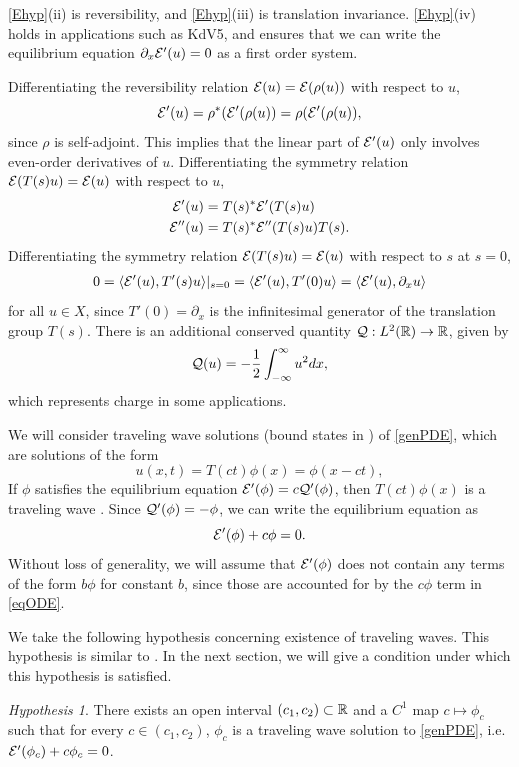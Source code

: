 \documentclass[11pt,reqno]{amsart}
\theoremstyle{plain}
\theoremstyle{definition}
\theoremstyle{remark}
\newtheorem{hypothesis}[theorem]{Hypothesis}
\begin{document}
\noi \cref{Ehyp}(ii) is reversibility, and \cref{Ehyp}(iii) is translation invariance. \cref{Ehyp}(iv) holds in applications such as KdV5, and ensures that we can write the equilibrium equation $\partial_x \mathcal{E}'(u) = 0$ as a first order system.

Differentiating the reversibility relation $\mathcal{E}(u) = \mathcal{E}(\rho(u))$ with respect to $u$,
\[
\mathcal{E}'(u) = \rho^*( \mathcal{E}'(\rho(u) ) = \rho( \mathcal{E}'(\rho(u) ),
\]
since $\rho$ is self-adjoint. This implies that the linear part of $\mathcal{E}'(u)$ only involves even-order derivatives of $u$. Differentiating the symmetry relation $\mathcal{E}(T(s)u) = \mathcal{E}(u)$ with respect to $u$,
\begin{align}
\mathcal{E}'(u) &= T(s)^* \mathcal{E}'(T(s)u) \label{Eprimesymm} \\
\mathcal{E}''(u) &= T(s)^* \mathcal{E}''(T(s)u) T(s). \label{EHessiansymm}
\end{align}
Differentiating the symmetry relation $\mathcal{E}(T(s)u) = \mathcal{E}(u)$ with respect to $s$ at $s = 0$, 
\begin{align*}
0 = \langle \mathcal{E}'(u), T'(s) u \rangle|_{s = 0}
= \langle \mathcal{E}'(u), T'(0) u \rangle
= \langle \mathcal{E}'(u), \partial_x u \rangle
\end{align*}
for all $u \in X$, since $T'(0) = \partial_x$ is the infinitesimal generator of the translation group $T(s)$. There is an additional conserved quantity $\mathcal{Q}: L^2(\mathbb{R}) \rightarrow \mathbb{R}$, given by
\begin{equation}\label{defV}
\mathcal{Q}(u) = -\frac{1}{2} \int_{-\infty}^\infty u^2 dx,
\end{equation}
which represents charge in some applications. 

We will consider traveling wave solutions (bound states in \cite{Grillakis1987}) of \cref{genPDE}, which are solutions of the form
\begin{equation}
u(x, t) = T(ct)\phi(x) = \phi(x - ct),
\end{equation}
If $\phi$ satisfies the equilibrium equation $\mathcal{E}'(\phi) = c \mathcal{Q}'(\phi)$, then $T(ct)\phi(x)$ is a traveling wave \cite{Grillakis1987}. Since $\mathcal{Q}'(\phi) = -\phi$, we can write the equilibrium equation as
\begin{equation}\label{eqODE}
\mathcal{E}'(\phi) + c \phi = 0.
\end{equation}
Without loss of generality, we will assume that $\mathcal{E}'(\phi)$ does not contain any terms of the form $b\phi$ for constant $b$, since those are accounted for by the $c \phi$ term in \cref{eqODE}.

We take the following hypothesis concerning existence of traveling waves. This hypothesis is similar to \cite[Assumption 2]{Grillakis1987}. In the next section, we will give a condition under which this hypothesis is satisfied. 
\begin{hypothesis}\label{cintervalhyp}
There exists an open interval $(c_1, c_2) \subset \mathbb{R}$ and a $C^1$ map $c \mapsto \phi_c$ such that for every $c \in (c_1, c_2)$, $\phi_c$ is a traveling wave solution to \cref{genPDE}, i.e. $\mathcal{E}'(\phi_c) + c \phi_c = 0$.
\end{hypothesis}
\end{document}
